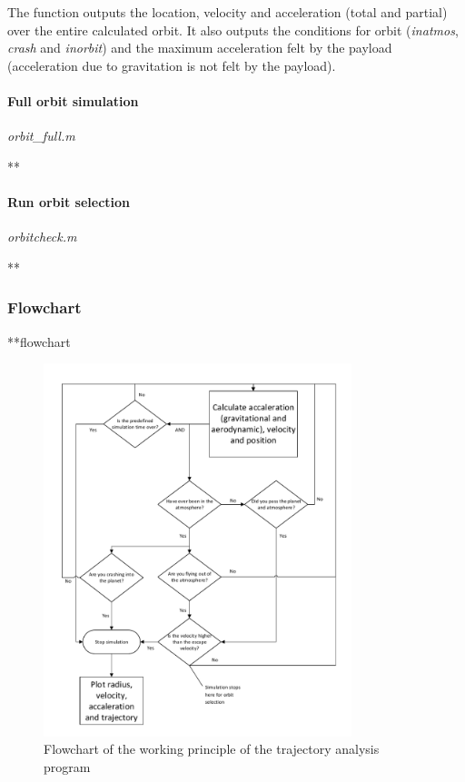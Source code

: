 The function outputs the location, velocity and acceleration (total and partial) over the entire calculated orbit. It also outputs the conditions for orbit (\textit{inatmos}, \textit{crash} and \textit{inorbit}) and the maximum acceleration felt by the payload (acceleration due to gravitation is not felt by the payload).

\paragraph{Full orbit simulation} \textit{orbit\_full.m}

**

\paragraph{Run orbit selection} \textit{orbitcheck.m}

**

\subsubsection{Flowchart} \label{subsec:flow}
**flowchart

\begin{figure}[H]
\centering
\hspace{-23mm}
\includegraphics[width = 0.8\textwidth]{Figure/astro_tool.pdf}
\vspace{-5mm}
\caption{Flowchart of the working principle of the trajectory analysis program}
\label{fig:traj_flow}
\end{figure}

